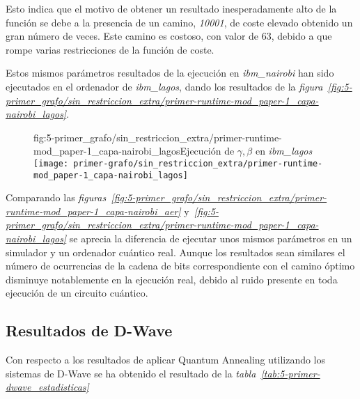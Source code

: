 Esto indica que el motivo de obtener un resultado inesperadamente alto de la función se debe a la presencia de un camino, \textit{10001}, de coste elevado obtenido un gran número de veces. Este camino es costoso, con valor de 63, debido a que rompe varias restricciones de la función de coste.

Estos mismos parámetros resultados de la ejecución en \textit{ibm\_nairobi} han sido ejecutados en el ordenador de \textit{ibm\_lagos}, dando los resultados de la \textit{figura~\ref{fig:5-primer_grafo/sin_restriccion_extra/primer-runtime-mod_paper-1_capa-nairobi_lagos}}.

\begin{figure}[htbp]{fig:5-primer_grafo/sin_restriccion_extra/primer-runtime-mod_paper-1_capa-nairobi_lagos}{Ejecución de \(\gamma, \beta\) en \textit{ibm\_lagos}}
  \centering
  \texttt{[image: primer-grafo/sin\_restriccion\_extra/primer-runtime-mod\_paper-1\_capa-nairobi\_lagos]}
\end{figure}

Comparando las \textit{figuras~\ref{fig:5-primer_grafo/sin_restriccion_extra/primer-runtime-mod_paper-1_capa-nairobi_aer}} y\textit{~\ref{fig:5-primer_grafo/sin_restriccion_extra/primer-runtime-mod_paper-1_capa-nairobi_lagos}}
se aprecia la diferencia de ejecutar unos mismos parámetros en un simulador y un ordenador cuántico real. Aunque los resultados sean similares el número de ocurrencias de la cadena de bits correspondiente con el camino óptimo disminuye notablemente en la ejecución real, debido al ruido presente en toda ejecución de un circuito cuántico.


\subsection{Resultados de D-Wave}

Con respecto a los resultados de aplicar Quantum Annealing utilizando los sistemas de D-Wave se ha obtenido el resultado de la \textit{tabla~\ref{tab:5-primer-dwave_estadisticas}}

